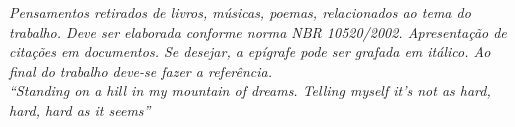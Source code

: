 


\vspace{7.5cm}
\thispagestyle{empty}
\begin{citacaodireta}

\textit{Pensamentos retirados de livros, músicas, poemas, relacionados ao tema do trabalho.
	Deve ser elaborada conforme norma NBR 10520/2002. Apresentação de citações em documentos.
	Se desejar, a epígrafe pode ser grafada em itálico.
	Ao final do trabalho deve-se fazer a referência. 
	\\
	``Standing on a hill in my mountain of dreams. Telling myself it's not as hard, hard, hard as it seems''} \cite{musica} 
	
\end{citacaodireta}
